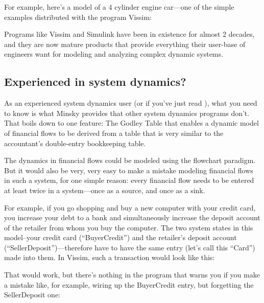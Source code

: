 For example, here's a model of a 4 cylinder engine car---one of the
simple examples distributed with the program Vissim:

\begin{center}
\end{center}

Programs like Vissim and Simulink have been in existence for almost 2
decades, and they are now mature products that provide everything
their user-base of engineers want for modeling and analyzing complex
dynamic systems. 

\subsection{Experienced in system dynamics?}
\label{intro:experienced}

As an experienced system dynamics user (or if you've just read ), what you need to know is what Minsky
provides that other system dynamics programs don't. That boils down to
one feature: The Godley Table that enables a dynamic model of
financial flows to be derived from a table that is very similar to the
accountant's double-entry bookkeeping table.


The dynamics in financial flows could be modeled using the flowchart
paradigm. But it would also be very, very easy to make a mistake
modeling financial flows in such a system, for one simple reason:
every financial flow needs to be entered at least twice in a
system---once as a source, and once as a sink.


For example, if you go shopping and buy a new computer with your
credit card, you increase your debt to a bank and simultaneously
increase the deposit account of the retailer from whom you buy the
computer. The two system states in this model--your credit card
(``BuyerCredit'') and the retailer's deposit account
(``SellerDeposit'')---therefore have to have the same entry (let's call
this ``Card'') made into them. In Vissim, such a transaction would look
like this:


\begin{center}
\end{center}

That would work, but there's nothing in the program that warns you if
you make a mistake like, for example, wiring up the BuyerCredit entry,
but forgetting the SellerDeposit one:

